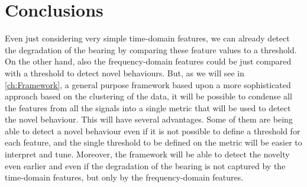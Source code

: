 \section{Conclusions}
Even just considering very simple time-domain features, we can already detect the degradation of the bearing by comparing these feature values to a threshold. On the other hand, also the frequency-domain features could be just compared with a threshold to detect novel behaviours. But, as we will see in \autoref{ch:Framework}, a general purpose framework based upon a more sophisticated approach based on the clustering of the data, it will be possible to condense all the features from all the signals into a single metric that will be used to detect the novel behaviour. This will have several advantages. Some of them are being able to detect a novel behaviour even if it is not possible to define a threshold for each feature, and the single threshold to be defined on the metric will be easier to interpret and tune. Moreover, the framework will be able to detect the novelty even earlier and even if the degradation of the bearing is not captured by the time-domain features, but only by the frequency-domain features.

